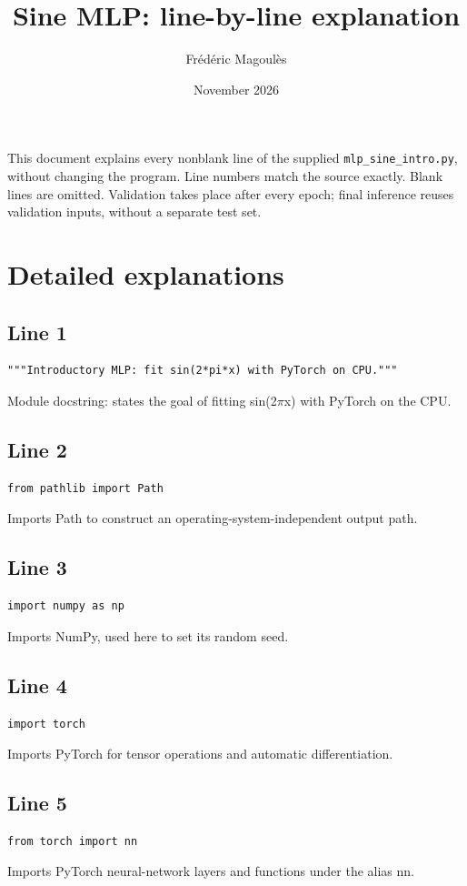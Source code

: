 \documentclass[11pt,a4paper]{article}
\title{Sine MLP: line-by-line explanation}
\author{Frédéric Magoulès}
\date{November 2026}
\begin{document}
\maketitle
\noindent This document explains every nonblank line of the supplied \texttt{mlp\_sine\_intro.py}, without changing the program. Line numbers match the source exactly. Blank lines are omitted. Validation takes place after every epoch; final inference reuses validation inputs, without a separate test set.
\section*{Detailed explanations}
\subsection*{Line 1}
\begin{lstlisting}
"""Introductory MLP: fit sin(2*pi*x) with PyTorch on CPU."""
\end{lstlisting}
Module docstring: states the goal of fitting sin(2$\pi$x) with PyTorch on the CPU.

\subsection*{Line 2}
\begin{lstlisting}
from pathlib import Path
\end{lstlisting}
Imports Path to construct an operating-system-independent output path.

\subsection*{Line 3}
\begin{lstlisting}
import numpy as np
\end{lstlisting}
Imports NumPy, used here to set its random seed.

\subsection*{Line 4}
\begin{lstlisting}
import torch
\end{lstlisting}
Imports PyTorch for tensor operations and automatic differentiation.

\subsection*{Line 5}
\begin{lstlisting}
from torch import nn
\end{lstlisting}
Imports PyTorch neural-network layers and functions under the alias nn.
\end{document}
